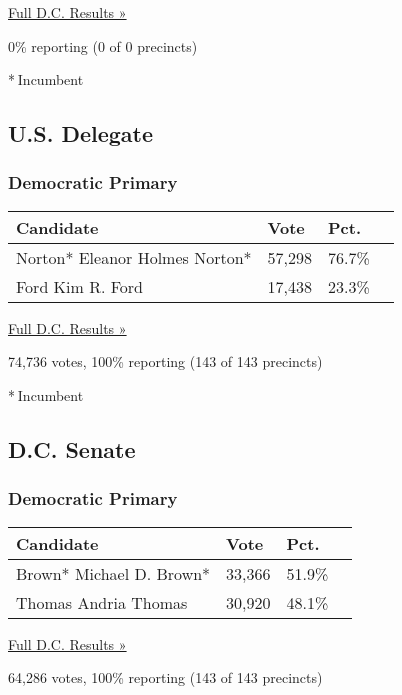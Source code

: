 \href{https://www.nytimes3xbfgragh.onion/elections/results/district-of-columbia}{Full
D.C. Results »}

0\% reporting (0 of 0 precincts)

* Incumbent

\hypertarget{us-delegate}{%
\subsection{U.S. Delegate}\label{us-delegate}}

\hypertarget{democratic-primary-3}{%
\subsubsection{Democratic Primary}\label{democratic-primary-3}}

\begin{longtable}[]{@{}llll@{}}
\toprule
Candidate & Vote & Pct. &\tabularnewline
\midrule
\endhead
 Norton* Eleanor Holmes Norton* & 57,298 & 76.7\% &\tabularnewline
 Ford Kim R. Ford & 17,438 & 23.3\% &\tabularnewline
\bottomrule
\end{longtable}

\href{https://www.nytimes3xbfgragh.onion/elections/results/district-of-columbia}{Full
D.C. Results »}

74,736 votes, 100\% reporting (143 of 143 precincts)

* Incumbent

\hypertarget{dc-senate}{%
\subsection{D.C. Senate}\label{dc-senate}}

\hypertarget{democratic-primary-4}{%
\subsubsection{Democratic Primary}\label{democratic-primary-4}}

\begin{longtable}[]{@{}llll@{}}
\toprule
Candidate & Vote & Pct. &\tabularnewline
\midrule
\endhead
 Brown* Michael D. Brown* & 33,366 & 51.9\% &\tabularnewline
 Thomas Andria Thomas & 30,920 & 48.1\% &\tabularnewline
\bottomrule
\end{longtable}

\href{https://www.nytimes3xbfgragh.onion/elections/results/district-of-columbia}{Full
D.C. Results »}

64,286 votes, 100\% reporting (143 of 143 precincts)

